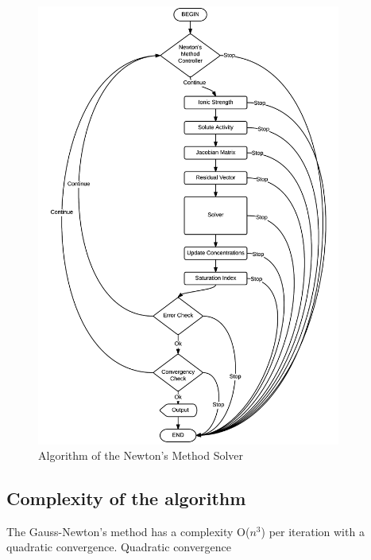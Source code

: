 \documentclass[ppgc,mestrado,english]{iiufrgs}
\begin{document}
\begin{figure}[ht!]
\centering
\includegraphics[width=100mm]{Shpeck_algo_newton.png}
\caption{Algorithm of the Newton's Method Solver}
\label{fig:Shpeck-algo-newton}
\end{figure}
\subsection{Complexity of the algorithm}
The Gauss-Newton's method has a complexity O($n^3$) per iteration with a quadratic convergence.
Quadratic convergence 

\end{document}
